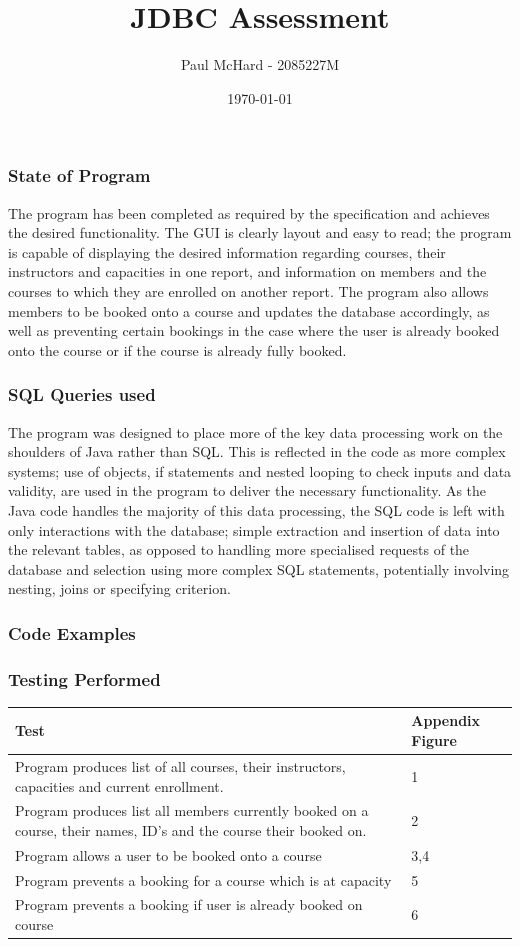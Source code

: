 \documentclass[12pt, oneside]{article}
\title{JDBC Assessment}
\author{Paul McHard - 2085227M}
\date{\today}
\begin{document}
\maketitle
\subsubsection*{State of Program}
The program has been completed as required by the specification and achieves the desired functionality. The GUI is clearly layout and easy to read; the program is capable of displaying the desired information regarding courses, their instructors and capacities in one report, and information on members and the courses to which they are enrolled on another report. The program also allows members to be booked onto a course and updates the database accordingly, as well as preventing certain bookings in the case where the user is already booked onto the course or if the course is already fully booked.
\subsubsection*{SQL Queries used}
The program was designed to place more of the key data processing work on the shoulders of Java rather than SQL. This is reflected in the code as more complex systems; use of objects, if statements  and nested looping to check inputs and data validity, are used in the program to deliver the necessary functionality. As the Java code handles the majority of this data processing, the SQL code is left with only interactions with the database; simple extraction and insertion of data into the relevant tables, as opposed to handling more specialised requests of the database and selection using more complex SQL statements, potentially involving nesting, joins or specifying criterion.
\subsubsection*{Code Examples}

\subsubsection*{Testing Performed}
\begin{center}
\begin{tabular}{ | m{12cm} | m{4cm} | } 
 \hline
 \textbf{Test} & \textbf{Appendix Figure} \\ 
  \hline
Program produces list of all courses, their instructors, capacities and current enrollment. & 1 \\ 
  \hline
 Program produces list all members currently booked on a course, their names, ID's and the course their booked on. & 2 \\ 
 \hline
 Program allows a user to be booked onto a course & 3,4 \\
 \hline
 Program prevents a booking for a course which is at capacity & 5 \\
 \hline
 Program prevents a booking if user is already booked on course & 6 \\
 \hline
\end{tabular}
\end{center}
\end{document}
